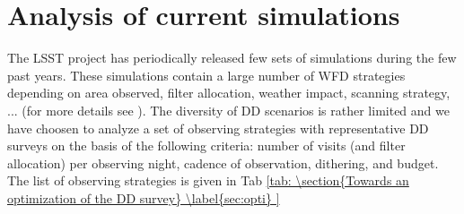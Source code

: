 \documentclass[\docopts]{\docclass}
\begin{document}
\section{Analysis of current simulations}
\label{sec:analysis}
The LSST project has periodically released few sets of simulations during the few past years. These simulations contain a large number of WFD strategies depending on area observed, filter allocation, weather impact, scanning strategy, ... (for more details see ). The diversity of DD scenarios is rather limited and we have choosen to analyze a set of observing strategies with representative DD surveys on the basis of the following criteria: number of visits (and filter allocation) per observing night, cadence of observation, dithering, and budget. The list of observing strategies is given in Tab \ref{tab:






\section{Towards an optimization of the DD survey}
\label{sec:opti}
}
\end{document}
